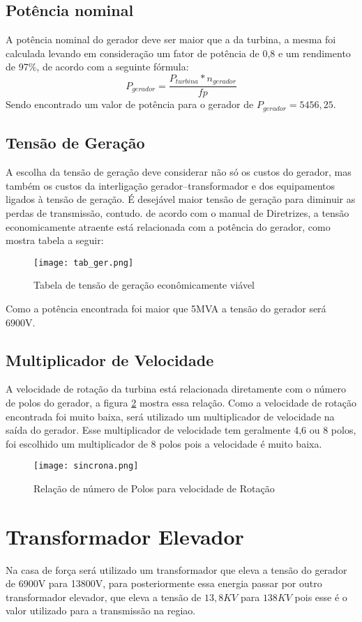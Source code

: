 \subsection{Potência nominal}
A potência nominal do gerador deve ser maior que a da turbina, a mesma foi calculada levando em consideração um fator de potência de 0,8 e um rendimento de 97\%, de acordo com a seguinte fórmula:
\begin{equation}
P_{gerador} = \dfrac{P_{turbina}*n_{gerador}}{fp}
\end{equation}
Sendo encontrado um valor de potência para o gerador de $P_{gerador} = 5456,25$.

\subsection{Tensão de Geração}
A escolha da tensão de geração deve considerar não só os custos do gerador, mas também os custos da interligação gerador–transformador e dos equipamentos ligados à tensão de geração. É desejável maior tensão de geração para diminuir as perdas de transmissão, contudo. de acordo com o manual de Diretrizes, a tensão economicamente atraente está relacionada com a potência do gerador, como mostra tabela a seguir:
\begin{figure}[h]
	\centering
	\texttt{[image: tab\_ger.png]}
	\caption{Tabela de tensão de geração econômicamente viável}
	\label{fig:tab_ger}
\end{figure}
Como a potência encontrada foi maior que 5MVA a tensão do gerador será 6900V.
\subsection{Multiplicador de Velocidade}
A velocidade de rotação da turbina está relacionada diretamente com o número de polos do gerador, a figura \ref{fig:sincrona} mostra essa relação. Como a velocidade de rotação encontrada foi muito baixa, será utilizado um multiplicador de velocidade na saída do gerador. Esse multiplicador de velocidade tem geralmente 4,6 ou 8 polos, foi escolhido um multiplicador de 8 polos pois a velocidade é muito baixa.
\begin{figure}[h]
	\centering
	\texttt{[image: sincrona.png]}
	\caption{Relação de número de Polos para velocidade de Rotação}
	\label{fig:sincrona}
\end{figure}

\section{Transformador Elevador}
Na casa de força será utilizado um transformador que eleva a tensão do gerador de 6900V para 13800V, para posteriormente essa energia passar por outro transformador elevador, que eleva a tensão de $13,8KV$ para $138KV$ pois esse é o valor utilizado para a transmissão na regiao.

